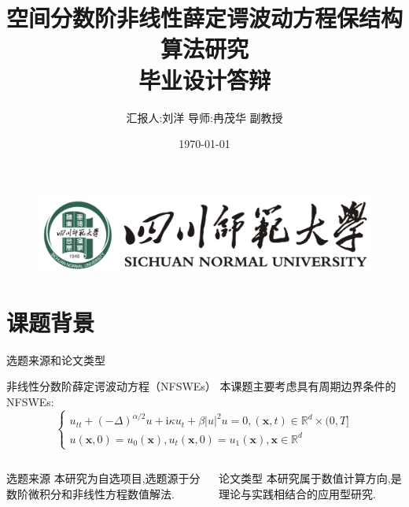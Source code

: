 \documentclass[aspectratio=169]{beamer}
\title[空间分数阶非线性薛定谔波动方程保结构算法研究
]{\small 空间分数阶非线性薛定谔波动方程保结构算法研究\\[2mm] 毕业设计答辩}
\author[刘洋]{\footnotesize 汇报人:刘洋 \quad 导师:冉茂华 副教授}
\institute[四川师范大学偏微分方程与物理团队]{\footnotesize 四川师范大学偏微分方程与物理团队}
\date{\footnotesize \vskip -10pt \today}
\begin{document}
\kaishu
\begin{frame}
	\titlepage
	\vspace{-2mm}
	\begin{figure}[htpb]
		\begin{center}
			\includegraphics[width=0.45\linewidth]{pic/SICNU_Logo2.png}
		\end{center}
	\end{figure}
\end{frame}
\begin{frame}
\tableofcontents[sectionstyle=show,subsectionstyle=show/shaded/hide,subsubsectionstyle=show/shaded/hide]
\end{frame}

\section{课题背景}
\begin{frame}{选题来源和论文类型}
	\begin{block}{非线性分数阶薛定谔波动方程（NFSWEs）}
		本课题主要考虑具有周期边界条件的 NFSWEs:
		\begin{equation}
			\left\{\begin{array}{l}
				u_{t t}+(-\Delta)^{\alpha / 2} u+\mathrm{i} \kappa u_t+\beta|u|^2 u=0,(\boldsymbol{x}, t) \in \mathbb{R}^d \times(0, T] \\
				u(\boldsymbol{x}, 0)=u_0(\boldsymbol{x}), u_t(\boldsymbol{x}, 0)=u_1(\boldsymbol{x}), \boldsymbol{x} \in \mathbb{R}^d
				\end{array}\right.\tag{8}
		\end{equation}
	  \end{block}

	  \begin{columns}
		\begin{column}{0.45\textwidth}
		  \begin{block}{选题来源}
			本研究为自选项目,选题源于分数阶微积分和非线性方程数值解法.
		  \end{block}
		\end{column}
		\begin{column}{0.45\textwidth}
		  \begin{block}{论文类型}
			本研究属于数值计算方向,是理论与实践相结合的应用型研究.	
		  \end{block}
		\end{column}
	  \end{columns}

\end{frame}
\end{document}
